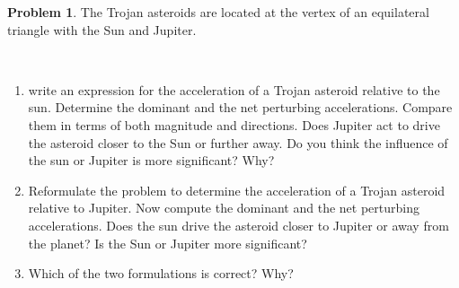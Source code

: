 \documentclass[10pt]{article}
\theoremstyle{definition}
\newtheorem{prob}{Problem}[section]
\newenvironment{subprob}%
{\renewcommand{\theenumi}{\alph{enumi}}\renewcommand{\labelenumi}{(\theenumi)}\begin{enumerate}}%
{\end{enumerate}}%
\begin{document}
\begin{prob}
    The Trojan asteroids are located at the vertex of an equilateral triangle with the Sun and Jupiter.
    \begin{figure}
        \centering
        ~
    \end{figure}

    \begin{subprob}
        \item write an expression for the acceleration of a Trojan asteroid relative to the sun. 
            Determine the dominant and the net perturbing accelerations.
            Compare them in terms of both magnitude and directions.
            Does Jupiter act to drive the asteroid closer to the Sun or further away.
            Do you think the influence of the sun or Jupiter is more significant?
            Why?
        \item Reformulate the problem to determine the acceleration of a Trojan asteroid relative to Jupiter.
            Now compute the dominant and the net perturbing accelerations. 
            Does the sun drive the asteroid closer to Jupiter or away from the planet?
            Is the Sun or Jupiter more significant?
        \item Which of the two formulations is correct?
            Why?
    \end{subprob}
\end{prob}
\end{document}
